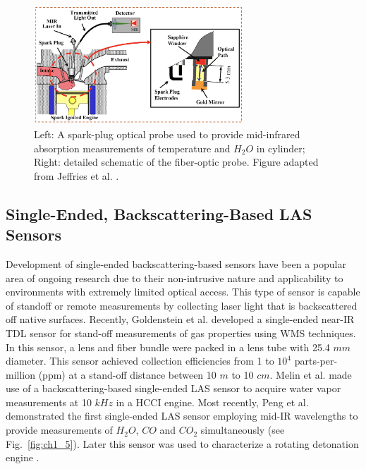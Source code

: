 \vspace{30mm}

\begin{figure}[ht]
    \centering
        \includegraphics[width=0.7\textwidth]{fig/ch1_fig3.png}
        \caption{Left: A spark-plug optical probe used to provide mid-infrared absorption measurements of temperature and $H_2O$ in cylinder; Right: detailed schematic of the fiber-optic probe. Figure adapted from Jeffries et al. \cite{Jeffries2010}.}
    \label{fig:ch1_4}
\end{figure}

\subsection{Single-Ended, Backscattering-Based LAS Sensors}
Development of single-ended backscattering-based sensors have been a popular area of ongoing research due to their non-intrusive nature and applicability to environments with extremely limited optical access. This type of sensor is capable of standoff or remote measurements by collecting laser light that is backscattered off native surfaces. Recently, Goldenstein et al. \cite{Goldenstein:16} developed a single-ended near-IR TDL sensor for stand-off measurements of gas properties using WMS techniques. In this sensor, a lens and fiber bundle were packed in a lens tube with 25.4 $mm$ diameter. This sensor achieved collection efficiencies from 1 to $10^4$ parts-per-million (ppm) at a stand-off distance between 10 $m$ to 10 $cm$. Melin et al. \cite{Melin2017} made use of a backscattering-based single-ended LAS sensor to acquire water vapor measurements at 10 $kHz$ in a HCCI engine. Most recently, Peng et al.  \cite{Peng:16} demonstrated the first single-ended LAS sensor employing mid-IR wavelengths to provide measurements of $H_2O$, $CO$ and $CO_2$ simultaneously (see Fig.\ \ref{fig:ch1_5}). Later this sensor was used to characterize a rotating detonation engine \cite{Peng2018}.



